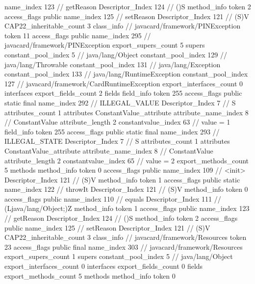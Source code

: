 {{{{{					name_index	123		// getReason
					Descriptor_Index	124		// ()S
				}
				method_info {
					token	2
					access_flags	public
					name_index	125		// setReason
					Descriptor_Index	121		// (S)V
				}
			}
			CAP22_inheritable_count	3
		}
		class_info {		// javacard/framework/PINException
			token	11
			access_flags	public
			name_index	295		// javacard/framework/PINException
			export_supers_count	5
			supers {
				constant_pool_index	5		// java/lang/Object
				constant_pool_index	129		// java/lang/Throwable
				constant_pool_index	131		// java/lang/Exception
				constant_pool_index	133		// java/lang/RuntimeException
				constant_pool_index	127		// javacard/framework/CardRuntimeException
			}
			export_interfaces_count	0
			interfaces {
			}
			export_fields_count	2
			fields {
			field_info {
				token	255
				access_flags	public static final
				name_index	292		// ILLEGAL_VALUE
				Descriptor_Index	7		// S
				attributes_count	1
				attributes {
				ConstantValue_attribute {
					attribute_name_index	8		// ConstantValue
					attribute_length	2
					constantvalue_index	63		// value = 1
				}
				}
			}
			field_info {
				token	255
				access_flags	public static final
				name_index	293		// ILLEGAL_STATE
				Descriptor_Index	7		// S
				attributes_count	1
				attributes {
				ConstantValue_attribute {
					attribute_name_index	8		// ConstantValue
					attribute_length	2
					constantvalue_index	65		// value = 2
				}
				}
			}
			}
			export_methods_count	5
			methods {
				method_info {
					token	0
					access_flags	public
					name_index	109		// <init>
					Descriptor_Index	121		// (S)V
				}
				method_info {
					token	1
					access_flags	public static
					name_index	122		// throwIt
					Descriptor_Index	121		// (S)V
				}
				method_info {
					token	0
					access_flags	public
					name_index	110		// equals
					Descriptor_Index	111		// (Ljava/lang/Object;)Z
				}
				method_info {
					token	1
					access_flags	public
					name_index	123		// getReason
					Descriptor_Index	124		// ()S
				}
				method_info {
					token	2
					access_flags	public
					name_index	125		// setReason
					Descriptor_Index	121		// (S)V
				}
			}
			CAP22_inheritable_count	3
		}
		class_info {		// javacard/framework/Resources
			token	23
			access_flags	public final
			name_index	303		// javacard/framework/Resources
			export_supers_count	1
			supers {
				constant_pool_index	5		// java/lang/Object
			}
			export_interfaces_count	0
			interfaces {
			}
			export_fields_count	0
			fields {
			}
			export_methods_count	5
			methods {
				method_info {
					token	0
}}}}}
